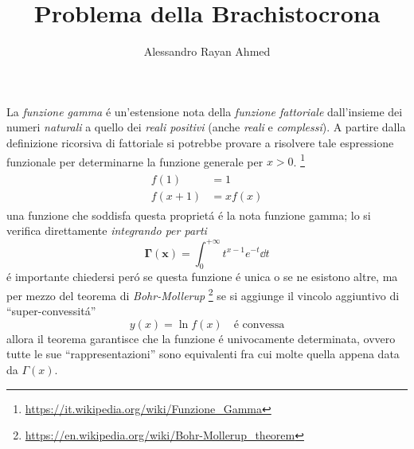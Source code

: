 

\usepackage[italian]{babel}




\title{Problema della Brachistocrona}
\author{Alessandro Rayan Ahmed}

\begin{multicols*}{3}
  \maketitle
  La \textit{funzione gamma} \'e un'estensione nota della \textit{funzione fattoriale} dall'insieme dei numeri
  \textit{naturali} a quello dei \textit{reali positivi} (anche \textit{reali} e \textit{complessi}).
  A partire dalla definizione ricorsiva di fattoriale si potrebbe provare a risolvere tale espressione
  funzionale per determinarne la funzione generale per $x > 0$.
  \footnote{\url{https://it.wikipedia.org/wiki/Funzione_Gamma}}
  \begin{align}
    \label{eq:gamma-implicit}
    \begin{split}
      f(1) &= 1 \\
      f(x+1) &= xf(x)
    \end{split}
  \end{align}
  una funzione che soddisfa questa propriet\'a \'e la nota funzione gamma; lo si verifica direttamente
  \textit{integrando per parti}
  \begin{equation}
    \label{eq:gamma-function}
    \boldsymbol{\Gamma(x)} = \int_0^{+\infty}t^{x-1}e^{-t} \dd{t}
  \end{equation}
  \'e importante chiedersi per\'o se questa funzione \'e unica o se ne esistono altre, ma per mezzo del
  teorema di \textit{Bohr-Mollerup}
  \footnote{\url{https://en.wikipedia.org/wiki/Bohr-Mollerup_theorem}}
  se si aggiunge il vincolo aggiuntivo di ``super-convessit\'a''
  \begin{equation}
    \label{eq:super-convexity}
    y(x) = \ln f(x) \quad \text{\'e convessa}
  \end{equation}
  allora il teorema garantisce che la funzione \'e univocamente determinata, ovvero tutte le sue
  ``rappresentazioni'' sono equivalenti fra cui molte quella appena data da $\Gamma(x)$.


\end{multicols*}
